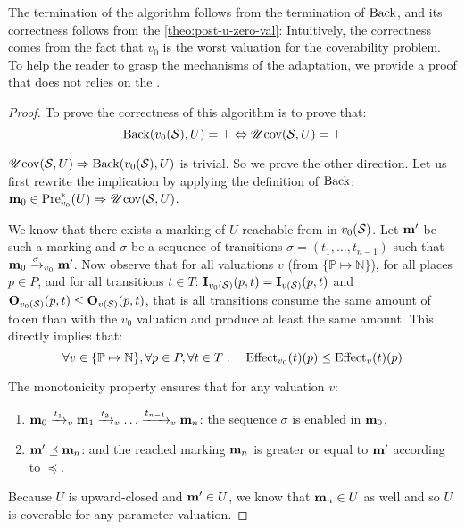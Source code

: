 The termination of the algorithm follows from the termination of $\operatorname{Back}$, and its correctness follows from the \autoref{theo:post-u-zero-val}:
Intuitively, the correctness comes from the fact that $v_0$ is the worst valuation for the coverability problem.
To help the reader to grasp the mechanisms of the adaptation, we provide a proof that does not relies on the .
\begin{proof}
  To prove the correctness of this algorithm is to prove that:
  \[
    \operatorname{Back}(v_0(\mathcal{S}), U) = \top \Leftrightarrow \operatorname{\mathscr{U}cov}(\mathcal{S}, U) = \top
  \]

$\operatorname{\mathscr{U}cov}(\mathcal{S}, U) \Rightarrow \operatorname{Back}(v_0(\mathcal{S}), U)$ is trivial. So we prove the other direction. Let us first rewrite the implication by applying the definition of $\operatorname{Back}$: $\mathbf{m}_0 \in \operatorname{Pre}_{v_0}^*(U) \Rightarrow \operatorname{\mathscr{U}cov}(\mathcal{S}, U)$.


  We know that there exists a marking of $U$ reachable from \mari in $v_0(\mathcal{S})$.
  Let $\mathbf{m'}$ be such a marking and $\sigma$ be a sequence of transitions $\sigma = (t_1, \dots, t_{n-1})$ such that $\mathbf{m}_0 \xrightarrow{\sigma}_{v_0} \mathbf{m'}$.
  Now observe that for all valuations $v$ (from $\{\mathbb{P} \mapsto \mathbb{N}\}$), for all places $p \in P$, and for all transitions $t \in T$: $\mathbf{I}_{v_0(\mathcal{S})}(p,t) = \mathbf{I}_{v(\mathcal{S})}(p,t)$ and $\mathbf{O}_{v_0(\mathcal{S})}(p,t) \leq \mathbf{O}_{v(\mathcal{S})}(p,t)$, that is all transitions consume the same amount of token than with the $v_0$ valuation and produce at least the same amount. This directly implies that: 
  \[
    \forall v \in \{\mathbb{P} \mapsto \mathbb{N}\}, \forall p \in P, \forall t \in T :
  \quad
  \operatorname{Effect}_{v_0}(t)(p) \leq \operatorname{Effect}_v(t)(p)
  \]

The monotonicity property ensures that for any valuation $v$:
  \begin{enumerate}
    \item $\mathbf{m}_0 \xrightarrow{t_1}_v \mathbf{m}_1 \xrightarrow{t_2}_v \dots \xrightarrow{t_{n-1}}_v \mathbf{m}_n$: the sequence $\sigma$ is enabled  in $\mathbf{m}_0$,
    \item $\mathbf{m'} \preceq \mathbf{m}_n$: and the reached marking $\mathbf{m}_n$ is greater or equal to $\mathbf{m'}$ according to $\preceq$.
  \end{enumerate}

  Because $U$ is upward-closed and $\mathbf{m'} \in U$, we know that $\mathbf{m}_n \in U$ as well and so $U$ is coverable for any parameter valuation.
\end{proof}

